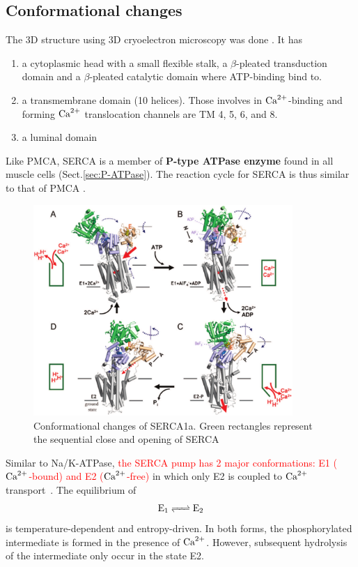 \subsection{Conformational changes}
\label{sec:SERCA_conformations}

The 3D structure using 3D cryoelectron microscopy was done
\citep{toyoshima1993}. It has
\begin{enumerate}
  \item a cytoplasmic head with a small flexible stalk, a $\beta$-pleated
  transduction domain and a $\beta$-pleated catalytic domain where ATP-binding
  bind to.
  \item a transmembrane domain (10 helices). Those involves in ${\text{Ca}^{2+}}$-binding and
  forming ${\text{Ca}^{2+}}$ translocation channels are TM 4, 5, 6, and 8.
  \item a luminal domain
\end{enumerate}

Like PMCA, SERCA is a member of {\bf P-type ATPase enzyme} found in all muscle
cells (Sect.\ref{sec:P-ATPase}). The reaction cycle for SERCA is thus similar to
that of PMCA .

\begin{figure}[hbt]
  \centerline{\includegraphics[height=8cm,
    angle=0]{./images/vangheluwe_serca.eps}}
\caption{Conformational changes of SERCA1a. Green rectangles represent
the sequential close and opening of SERCA \citep{Vangheluwe2006}}
\label{fig:vangheluwe_serca}
\end{figure}

Similar to Na/K-ATPase, \textcolor{red}{the SERCA pump has 2 major
conformations: E1 (${\text{Ca}^{2+}}$-bound) and E2 (${\text{Ca}^{2+}}$-free)} in which only E2 is coupled
to ${\text{Ca}^{2+}}$ transport~\citep{inesi1976}.  The equilibrium of
\begin{equation}
  \label{eq:1205}
  \ce{E1 <=> E2}
\end{equation}
is temperature-dependent and entropy-driven. In both forms, the
phosphorylated intermediate is formed in the presence of
${\text{Ca}^{2+}}$. However, subsequent hydrolysis of the intermediate only occur
in the state E2.


